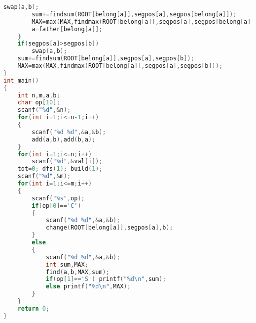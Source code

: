 \begin{lstlisting}[language=c++]
			swap(a,b);
		sum+=findsum(ROOT[belong[a]],segpos[a],segpos[belong[a]]);
		MAX=max(MAX,findmax(ROOT[belong[a]],segpos[a],segpos[belong[a]]));
		a=father[belong[a]];
	}
	if(segpos[a]>segpos[b])
		swap(a,b);
	sum+=findsum(ROOT[belong[a]],segpos[a],segpos[b]);
	MAX=max(MAX,findmax(ROOT[belong[a]],segpos[a],segpos[b]));
}
int main()
{
	int n,m,a,b;
	char op[10];
	scanf("%d",&n);
	for(int i=1;i<=n-1;i++)
	{
		scanf("%d %d",&a,&b);
		add(a,b),add(b,a);	
	}
	for(int i=1;i<=n;i++)
		scanf("%d",&val[i]);
	tot=0; dfs(1); build(1);
	scanf("%d",&m);
	for(int i=1;i<=m;i++)
	{
		scanf("%s",op);
		if(op[0]=='C') 
		{
			scanf("%d %d",&a,&b);
			change(ROOT[belong[a]],segpos[a],b);	
		}	
		else
		{
			scanf("%d %d",&a,&b);
			int sum,MAX;
			find(a,b,MAX,sum);
			if(op[1]=='S') printf("%d\n",sum);
			else printf("%d\n",MAX);
		}
	}
	return 0;
}
    \end{lstlisting}
